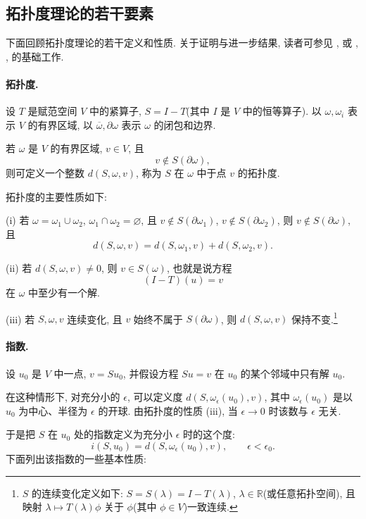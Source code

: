 \hypertarget{chapter-02-page-178}{}
\subsection{拓扑度理论的若干要素}
\label{subsec:ch2-topological-degree-elements}
下面回顾拓扑度理论的若干定义和性质. 关于证明与进一步结果, 读者可参见 , 或 , ,  的基础工作.

\paragraph{拓扑度.}
设 $T$ 是赋范空间 $V$ 中的紧算子, $S=I-T$(其中 $I$ 是 $V$ 中的恒等算子). 以 $\omega,\omega_i$ 表示 $V$ 的有界区域, 以 $\overline\omega,\partial\omega$ 表示 $\omega$ 的闭包和边界.

若 $\omega$ 是 $V$ 的有界区域, $v\in V$, 且
\[
v\notin S(\partial\omega),
\]
则可定义一个整数 $d(S,\omega,v)$, 称为 $S$ 在 $\omega$ 中于点 $v$ 的拓扑度.

拓扑度的主要性质如下:

(i) 若 $\omega=\omega_1\cup\omega_2$, $\omega_1\cap\omega_2=\varnothing$, 且 $v\notin S(\partial\omega_1)$, $v\notin S(\partial\omega_2)$, 则 $v\notin S(\partial\omega)$, 且
\[
d(S,\omega,v)=d(S,\omega_1,v)+d(S,\omega_2,v).
\]

(ii) 若 $d(S,\omega,v)\ne0$, 则 $v\in S(\omega)$, 也就是说方程
\[
(I-T)(u)=v
\]
在 $\omega$ 中至少有一个解.

(iii) 若 $S,\omega,v$ 连续变化, 且 $v$ 始终不属于 $S(\partial\omega)$, 则 $d(S,\omega,v)$ 保持不变.\footnote{$S$ 的连续变化定义如下: $S=S(\lambda)=I-T(\lambda)$, $\lambda\in\mathbb R$(或任意拓扑空间), 且映射 $\lambda\mapsto T(\lambda)\phi$ 关于 $\phi$(其中 $\phi\in V$)一致连续.}

\paragraph{指数.}
设 $u_0$ 是 $V$ 中一点, $v=Su_0$, 并假设方程 $Su=v$ 在 $u_0$ 的某个邻域中只有解 $u_0$.

在这种情形下, 对充分小的 $\epsilon$, 可以定义度 $d(S,\omega_\epsilon(u_0),v)$, 其中 $\omega_\epsilon(u_0)$ 是以 $u_0$ 为中心、半径为 $\epsilon$ 的开球. 由拓扑度的性质 (iii), 当 $\epsilon\to0$ 时该数与 $\epsilon$ 无关.

于是把 $S$ 在 $u_0$ 处的指数定义为充分小 $\epsilon$ 时的这个度:
\[
i(S,u_0)=d(S,\omega_\epsilon(u_0),v),
\qquad \epsilon<\epsilon_0.
\]
下面列出该指数的一些基本性质:

